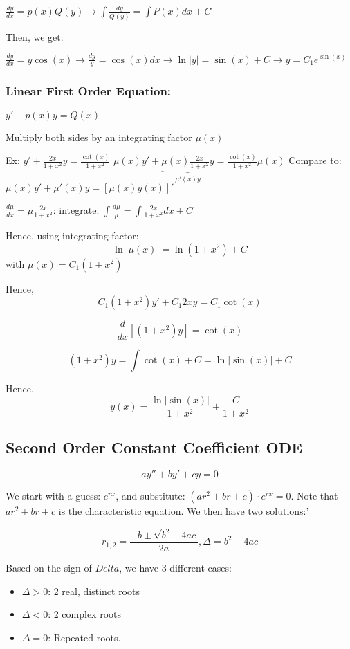 \documentclass{article}
\begin{document}
$\frac{dy}{dx} = p(x) Q(y) \longrightarrow \int{\frac{dy}{Q(y)}} = \int{P(x) dx + C}$

Then, we get:

$\frac{dy}{dx} = y \cos(x) \rightarrow \frac{dy}{y} = \cos(x) dx \longrightarrow \ln{|y|} = \sin(x) + C \rightarrow y = C_1 e^{\sin(x)}$

\subsubsection{Linear First Order Equation:}

$y' + p(x) y = Q(x)$

Multiply both sides by an integrating factor $\mu(x)$

Ex: $y' + \frac{2x}{1 + x^2} y = \frac{\cot(x)}{1 + x^2}$
$\mu(x) y' + \underbrace{\mu(x) \frac{2x}{1 + x^2} y}_{\mu'(x) y} = \frac{\cot(x)}{1 + x^2} \mu(x)$
Compare to: $\mu(x) y' + \mu'(x) y = \left[\mu(x) y(x) \right]'$

$\frac{d \mu}{dx} = \mu \frac{2x}{1 + x^2}$: integrate: $\int{\frac{d \mu}{\mu}} = \int{\frac{2x}{1 + x^2} dx + C}$

Hence, using integrating factor: $$ \ln |\mu(x)| = \ln(1 + x^2) + C$$ with $\mu(x) = C_1 (1 + x^2)$

Hence, $$C_1(1 + x^2) y' + C_1 2xy = C_1 \cot(x)$$

$$\frac{d}{dx} \left[ (1 + x^2) y \right] = \cot(x)$$

$$(1+x^2)y = \int \cot(x) + C = \ln|\sin(x)| + C$$

Hence, $$y(x) = \frac{\ln|\sin(x)|}{1+x^2} + \frac{C}{1+x^2}$$

\subsection{Second Order Constant Coefficient ODE}

$$ay'' + by' + cy = 0$$

We start with a guess: $e^{rx}$, and substitute: $(ar^2 + br + c) \cdot e^{rx} = 0$. Note that $ar^2 + br + c$ is the characteristic equation. We then have two solutions:'

$$r_{1,2} = \frac{-b \pm \sqrt{b^2 - 4ac}}{2a}, \Delta = b^2 - 4ac$$

Based on the sign of $Delta$, we have 3 different cases:

\begin{itemize}
    \item $\Delta > 0$: 2 real, distinct roots
    \item $\Delta < 0$: 2 complex roots
    \item $\Delta = 0$: Repeated roots.
\end{itemize}
\end{document}
